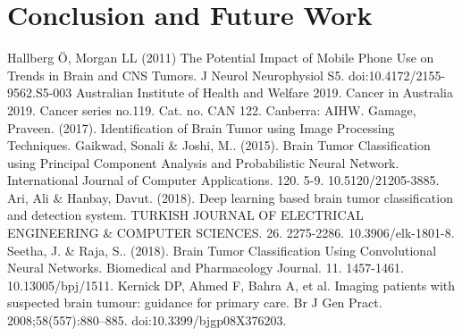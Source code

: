 \documentclass[conference]{IEEEtran}
\begin{document}
\section{Conclusion and Future Work}\label{conclusion}


\begin{thebibliography}{00}
 Hallberg Ö, Morgan LL (2011) The Potential Impact of Mobile Phone Use on Trends in Brain and CNS Tumors. J Neurol Neurophysiol S5. doi:10.4172/2155-9562.S5-003
 Australian Institute of Health and Welfare 2019. Cancer in Australia 2019. Cancer series no.119. Cat. no. CAN 122. Canberra: AIHW.
 Gamage, Praveen. (2017). Identification of Brain Tumor using Image Processing Techniques. 
 Gaikwad, Sonali \& Joshi, M.. (2015). Brain Tumor Classification using Principal Component Analysis and Probabilistic Neural Network. International Journal of Computer Applications. 120. 5-9. 10.5120/21205-3885.
 Ari, Ali \& Hanbay, Davut. (2018). Deep learning based brain tumor classification and detection system. TURKISH JOURNAL OF ELECTRICAL ENGINEERING \& COMPUTER SCIENCES. 26. 2275-2286. 10.3906/elk-1801-8.
 Seetha, J. \& Raja, S.. (2018). Brain Tumor Classification Using Convolutional Neural Networks. Biomedical and Pharmacology Journal. 11. 1457-1461. 10.13005/bpj/1511. 
 Kernick DP, Ahmed F, Bahra A, et al. Imaging patients with suspected brain tumour: guidance for primary care. Br J Gen Pract. 2008;58(557):880–885. doi:10.3399/bjgp08X376203.
\end{thebibliography}
\end{document}

